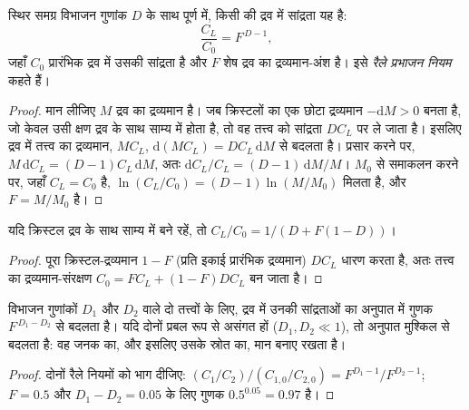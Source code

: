 \begin{theorem}[रैले प्रभाजन नियम]\label{thm:b2:magmatic-differentiation:rayleigh}
स्थिर समग्र विभाजन गुणांक $D$ के साथ पूर्ण  में,
किसी  की द्रव में सांद्रता यह है:
\[
\frac{C_L}{C_0} = F^{\,D-1},
\]
जहाँ $C_0$ प्रारंभिक द्रव में उसकी सांद्रता है और $F$ शेष द्रव का
द्रव्यमान-अंश है। इसे \emph{रैले प्रभाजन नियम}
कहते हैं।
\end{theorem}

\begin{proof}
मान लीजिए $M$ द्रव का द्रव्यमान है। जब क्रिस्टलों का एक छोटा द्रव्यमान $-\mathrm dM > 0$
बनता है, जो केवल उसी क्षण द्रव के साथ साम्य में होता है, तो वह तत्त्व को
सांद्रता $DC_L$ पर ले जाता है। इसलिए द्रव में तत्त्व का द्रव्यमान, $MC_L$,
$\mathrm d(MC_L) = DC_L\,\mathrm dM$ से बदलता है। प्रसार करने पर, $M\,\mathrm dC_L = (D-1)C_L\,
\mathrm dM$, अतः $\mathrm dC_L/C_L = (D-1)\,\mathrm dM/M$। $M_0$ से समाकलन करने पर,
जहाँ $C_L = C_0$ है, $\ln(C_L/C_0) = (D-1)\ln(M/M_0)$ मिलता है, और $F = M/M_0$ है।
\end{proof}

\begin{proposition}[किसी अनुरेखी तत्त्व का साम्य क्रिस्टलन]
\label{prop:b2:magmatic-differentiation:equilibrium}
यदि क्रिस्टल द्रव के साथ साम्य में बने रहें, तो $C_L/C_0 = 1/(D + F(1-D))$।
\end{proposition}

\begin{proof}
पूरा क्रिस्टल-द्रव्यमान $1-F$ (प्रति इकाई प्रारंभिक द्रव्यमान) $DC_L$ धारण करता है, अतः तत्त्व का
द्रव्यमान-संरक्षण $C_0 = FC_L + (1-F)DC_L$ बन जाता है।
\end{proof}

\begin{corollary}[असंगत तत्त्वों के अनुपात]\label{cor:b2:magmatic-differentiation:ratio}
विभाजन गुणांकों $D_1$ और $D_2$ वाले दो तत्त्वों के लिए, द्रव में उनकी
सांद्रताओं का अनुपात  में गुणक $F^{\,D_1-D_2}$ से बदलता है।
यदि दोनों प्रबल रूप से असंगत हों ($D_1, D_2 \ll 1$), तो अनुपात
मुश्किल से बदलता है: वह जनक  का, और इसलिए उसके स्रोत का, मान बनाए रखता है।
\end{corollary}

\begin{proof}
दोनों रैले नियमों को भाग दीजिए: $(C_1/C_2)/(C_{1,0}/C_{2,0}) = F^{D_1-1}/F^{D_2-1}$;
$F = 0.5$ और $D_1 - D_2 = 0.05$ के लिए गुणक $0.5^{0.05} = 0.97$ है।
\end{proof}

